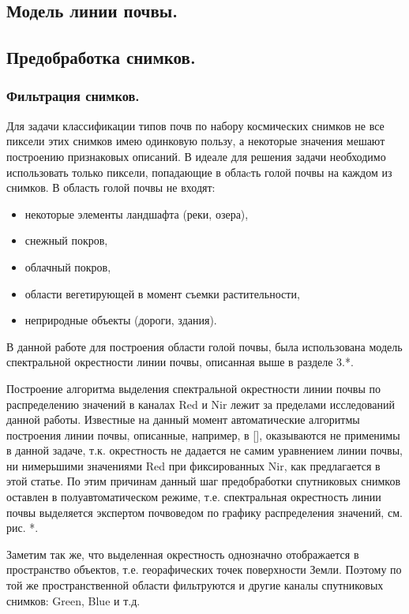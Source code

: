 \documentclass[12pt]{article}
\begin{document}
\subsection{Модель линии почвы.}


\subsection{Предобработка снимков.}


\subsubsection{Фильтрация снимков.}

\par
Для задачи классификации типов почв по набору космических снимков не все пиксели этих снимков
имею одинковую пользу, а некоторые значения мешают построению признаковых описаний. В идеале
для решения задачи необходимо использовать только пиксели, попадающие в облаcть голой почвы
на каждом из снимков. В область голой почвы не входят:
\begin{itemize}
\item некоторые элементы ландшафта (реки, озера),
\item снежный покров,
\item облачный покров,
\item области вегетирующей в момент съемки растительности,
\item неприродные объекты (дороги, здания).
\end{itemize}
В данной работе для построения области голой почвы, была использована
модель спектральной окрестности линии почвы, описанная выше в разделе {\color{red} 3.*}.
\par
Построение алгоритма выделения спектральной окрестности линии почвы по распределению 
значений в каналах Red и Nir лежит за пределами исследований данной работы. Известные на данный
момент автоматические алгоритмы построения линии почвы, описанные, например, в {\color{red}[]},
оказываются не применимы в данной задаче, т.к. окрестность не дадается не самим уравнением линии
почвы, ни нимерьшими значениями Red при фиксированных Nir, как предлагается в этой статье.
По этим причинам данный шаг предобработки спутниковых снимков оставлен в полуавтоматическом режиме,
т.е. спектральная окрестность линии почвы выделяется экспертом почвоведом по графику распределения
значений, см. рис. {\color{red}*}.
\par
Заметим так же, что выделенная окрестность однозначно отображается в пространство объектов,
т.е. георафических точек поверхности Земли. Поэтому по той же пространственной области
фильтруются и другие каналы спутниковых снимков: Green, Blue и т.д.
\end{document}
